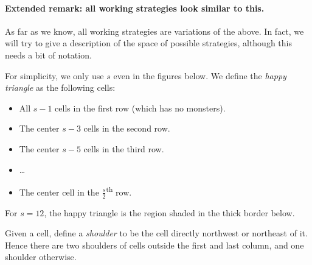 \documentclass[11pt]{scrartcl}
\begin{document}
\paragraph{Extended remark: all working strategies look similar to this.}
As far as we know, all working strategies are variations of the above.
In fact, we will try to give a description of the space of possible strategies,
although this needs a bit of notation.

\begin{definition*}
For simplicity, we only use $s$ even in the figures below.
We define the \emph{happy triangle} as the following cells:
\begin{itemize}
  \item All $s-1$ cells in the first row (which has no monsters).
  \item The center $s-3$ cells in the second row.
  \item The center $s-5$ cells in the third row.
  \item \dots
  \item The center cell in the $\frac s2$\textsuperscript{th} row.
\end{itemize}
\end{definition*}
For $s=12$, the happy triangle is the region shaded in the thick border below.
\begin{center}
\end{center}
\begin{definition*}
  Given a cell, define a \emph{shoulder} to be the cell directly northwest or northeast of it.
  Hence there are two shoulders of cells outside the first and last column,
  and one shoulder otherwise.
\end{definition*}
\end{document}
